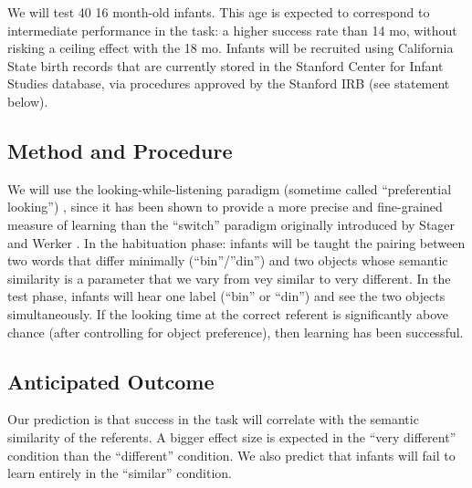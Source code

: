\documentclass[12pt]{article}
\begin{document}
We will test 40 16 month-old infants. This age is expected to correspond to intermediate performance in the task: a higher success rate than 14 mo, without risking a ceiling effect with the 18 mo. Infants will be recruited using California State birth records that are currently stored in the Stanford Center for Infant Studies database, via procedures approved by the Stanford IRB (see statement below). 

\subsection{Method and Procedure}

We will use the looking-while-listening paradigm (sometime called ``preferential looking'') \cite{fernald2008}, since it has been shown to provide a more precise and fine-grained measure of learning than the ``switch'' paradigm originally introduced by Stager and Werker \cite{yoshida2009}. In the habituation phase: infants will be taught the pairing between two words that differ minimally (``bin''/''din'') and two objects whose semantic similarity is a parameter that we vary from vey similar to very different. In the test phase, infants will hear one label (``bin'' or ``din'') and see the two objects simultaneously. If the looking time at the correct referent is significantly above chance (after controlling for object preference), then learning has been successful. 

\subsection{Anticipated Outcome}

Our prediction is that success in the task will correlate with the semantic similarity of the referents. A bigger effect size is expected in the ``very different'' condition than the ``different'' condition. We also predict that infants will fail to learn entirely in the ``similar'' condition.


\end{document}
